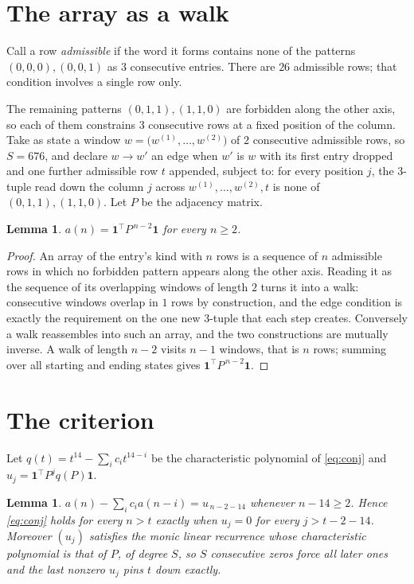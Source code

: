 \documentclass[11pt,a4paper]{article}
\theoremstyle{plain}
\newtheorem{lemma}[theorem]{Lemma}
\theoremstyle{definition}
\begin{document}
\section{The array as a walk}

Call a row \emph{admissible} if the word it forms contains none of the patterns
$(0,0,0), (0,0,1)$ as $3$ consecutive entries. There are $26$ admissible rows; that condition
involves a single row only.

The remaining patterns $(0,1,1), (1,1,0)$ are forbidden along the other axis, so each of them
constrains $3$ consecutive rows at a fixed position of the column. Take as state a
window $w=\bigl(w^{(1)},\dots,w^{(2)}\bigr)$ of $2$ consecutive admissible
rows, so $S=676$, and declare $w\to w'$ an edge when $w'$ is $w$ with its first entry
dropped and one further admissible row $t$ appended, subject to: for every position
$j$, the $3$-tuple read down the column $j$ across $w^{(1)},\dots,w^{(2)},t$
is none of $(0,1,1), (1,1,0)$. Let $P$ be the adjacency matrix.

\begin{lemma}\label{lem:walk}
$a(n)=\mathbf{1}^{\!\top}P^{\,n-2}\mathbf{1}$ for every $n\ge2$.
\end{lemma}

\begin{proof}
An array of the entry's kind with $n$ rows is a sequence of $n$ admissible rows in
which no forbidden pattern appears along the other axis. Reading it as the sequence of its
overlapping windows of length $2$ turns it into a walk: consecutive windows overlap in
$1$ rows by construction, and the edge condition is exactly the requirement on the one
new $3$-tuple that each step creates. Conversely a walk reassembles into such an array,
and the two constructions are mutually inverse. A walk of length $n-2$ visits $n-1$
windows, that is $n$ rows; summing over all starting and ending states gives
$\mathbf{1}^{\!\top}P^{\,n-2}\mathbf{1}$.
\end{proof}

\section{The criterion}

Let $q(t)=t^{14}-\sum_i c_i t^{14-i}$ be the characteristic polynomial of
\eqref{eq:conj} and $u_j=\mathbf{1}^{\!\top}P^{j}q(P)\mathbf{1}$.

\begin{lemma}\label{lem:crit}
$a(n)-\sum_i c_i a(n-i)=u_{\,n-2-14}$ whenever $n-14\ge2$. Hence
\eqref{eq:conj} holds for every $n>t$ exactly when $u_j=0$ for every
$j>t-2-14$. Moreover $(u_j)$ satisfies the monic linear recurrence whose
characteristic polynomial is that of $P$, of degree $S$, so $S$ consecutive zeros force all
later ones and the last nonzero $u_j$ pins $t$ down exactly.
\end{lemma}
\end{document}
